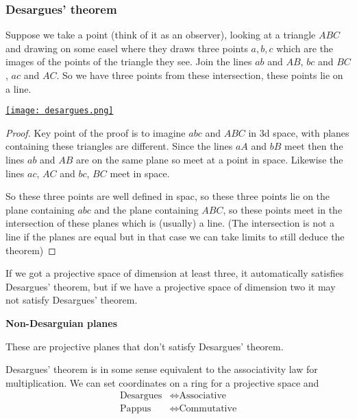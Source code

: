 \subsubsection{Desargues' theorem}
\begin{theorem}
    Suppose we take a point (think of it as an observer), looking at a triangle $ABC$ and drawing on some easel where they draws three points $a,b,c$ which are the images of the points of the triangle they see. Join the lines $ab$ and $AB$, $bc$ and $BC$, $ac$ and $AC$. So we have three points from these intersection, these points lie on a line.

    \href{https://youtu.be/idd0eE5Bhsc?t=229}{\texttt{[image: desargues.png]}}

\begin{proof}
    Key point of the proof is to imagine $abc$ and $ABC$ in 3d space, with planes containing these triangles are different. Since the lines $aA$ and $bB$ meet then the lines $ab$ and $AB$ are on the same plane so meet at a point in space. Likewise the lines $ac$, $AC$ and $bc$, $BC$ meet in space.

    So these three points are well defined in spac, so these three points lie on the plane containing $abc$ and the plane containing $ABC$, so these points meet in the intersection of these planes which is (usually) a line. (The intersection is not a line if the planes are equal but in that case we can take limits to still deduce the theorem)
\end{proof}
\end{theorem}

If we got a projective space of dimension at least three, it automatically satisfies Desargues' theorem, but if we have a projective space of dimension two it may not satisfy Desargues' theorem. 

\begin{definition}\textbf{Non-Desarguian planes}

    These are projective planes that don't satisfy Desargues' theorem. 
\end{definition}

Desargues' theorem is in some sense equivalent to the associativity law for multiplication. We can set coordinates on a ring for a projective space and\begin{align*}
    \text{Desargues} &\iff \text{Associative}\\
    \text{Pappus} &\iff \text{Commutative}
\end{align*}

